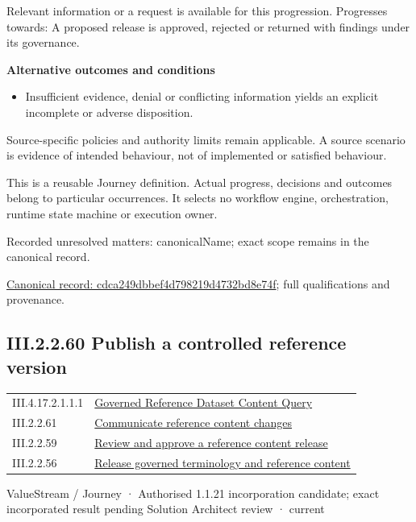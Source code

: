 Relevant information or a request is available for this progression. Progresses towards: A proposed release is approved, rejected or returned with findings under its governance.



\par\medskip\textbf{Alternative outcomes and conditions}\par


\begin{itemize}


\item Insufficient evidence, denial or conflicting information yields an explicit incomplete or adverse disposition.

\end{itemize}


Source-specific policies and authority limits remain applicable. A source scenario is evidence of intended behaviour, not of implemented or satisfied behaviour.



This is a reusable Journey definition. Actual progress, decisions and outcomes belong to particular occurrences. It selects no workflow engine, orchestration, runtime state machine or execution owner.


{\small Recorded unresolved matters: canonicalName; exact scope remains in the canonical record.}\par
{\footnotesize \href{../../../../continuum/strategy/value-stream/cdca249dbbef4d798219d4732bd8e74f.md}{Canonical record: cdca249dbbef4d798219d4732bd8e74f}; full qualifications and provenance.}\par
\subsection*{III.2.2.60 Publish a controlled reference version}
\label{navigation:III.2.2.60}

\begin{longtable}{p{.22\linewidth}p{.73\linewidth}}
III.4.17.2.1.1.1 & \hyperref[element:625ef1036a7442b2b8aed06f72b8afff]{Governed Reference Dataset Content Query} \\
III.2.2.61 & \hyperref[element:9faf0704382e4b428814c2e9bf72eec0]{Communicate reference content changes} \\
III.2.2.59 & \hyperref[element:cdca249dbbef4d798219d4732bd8e74f]{Review and approve a reference content release} \\
III.2.2.56 & \hyperref[element:e9a8a77c5f9c4361af4dfcfa607ece2d]{Release governed terminology and reference content} \\
\end{longtable}
\label{element:156eb857d5c14baaae1c1cc59fe3490b}
{\small ValueStream / Journey · Authorised 1.1.21 incorporation candidate; exact incorporated result pending Solution Architect review · current}\par

